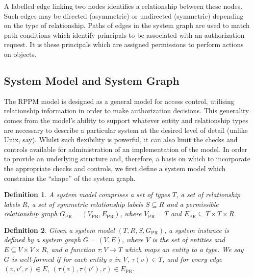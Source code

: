 \documentclass{article}
\newtheorem{definition}{Definition}
\begin{document}
A labelled edge linking two nodes identifies a relationship between these nodes.
Such edges may be directed (asymmetric) or undirected (symmetric) depending on the type of relationship.
Paths of edges in the system graph are used to match path conditions which identify principals to be associated with an authorization request.
It is these principals which are assigned permissions to perform actions on objects.

\subsection{System Model and System Graph}\label{sec:model:system_graph}
The RPPM model is designed as a general model for access control, utilising relationship information in order to make authorization decisions.
This generality comes from the model's ability to support whatever entity and relationship types are necessary to describe a particular system at the desired level of detail (unlike Unix, say).
Whilst such flexibility is powerful, it can also limit the checks and controls available for administration of an implementation of the model.
In order to provide an underlying structure and, therefore, a basis on which to incorporate the appropriate checks and controls, we first define a system model which constrains the ``shape'' of the system graph.

\begin{definition}A \emph{system model} comprises a set of types $T$, a set of relationship labels $R$, a set of \emph{symmetric} relationship labels $S \subseteq R$ and a \emph{permissible relationship graph} $G_{\textrm{PR}} = (V_{\textrm{PR}},E_{\textrm{PR}})$, where $V_{\textrm{PR}} = T$ and $E_{\textrm{PR}} \subseteq T \times T \times R$.
\end{definition}


\begin{definition}Given a system model $(T,R,S,G_{\textrm{PR}})$, a \emph{system instance} is defined by a \emph{system graph} $G = (V,E)$, where $V$ is the set of entities and $E \subseteq V \times V \times R$, and a function $\tau : V \rightarrow T$ which maps an entity to a type.
    We say $G$ is \emph{well-formed} if for each entity $v$ in $V$, $\tau(v) \in T$, and for every edge $(v,v',r) \in E$, $(\tau(v),\tau(v'),r) \in E_{\textrm{PR}}$.
\end{definition}
\end{document}
